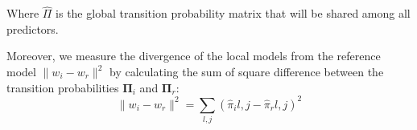Where $\hat{\Pi}$ is the global transition probability matrix that will be shared among all \pmcmr predictors. 
\par Moreover, we measure the divergence of the local models from the reference model  $\|w_i - w_r\|^2$ by calculating the sum of square difference between the transition probabilities  $\boldsymbol{\Pi}_i$ and  $\boldsymbol{\Pi}_r$:
\begin{equation*}
\label{eq:dis_pi_varinace}
\|w_i - w_r\|^2=\sum_{l,j} (\hat{\pi}_i{l,j} -\hat{\pi}_r{l,j})^2
\end{equation*}



